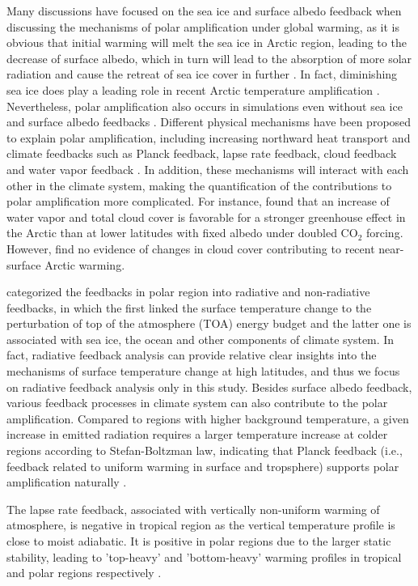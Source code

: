Many discussions have focused on the sea ice and surface albedo feedback when discussing the mechanisms of polar amplification under global warming, as it is obvious that initial warming will melt the sea ice in Arctic region, leading to the decrease of surface albedo, which in turn will lead to the absorption of more solar radiation and cause the retreat of sea ice cover in further \citep{Serreze2011}. In fact, diminishing sea ice does play a leading role in recent Arctic temperature amplification \citep{Screen2010}. Nevertheless, polar amplification also occurs in simulations even without sea ice and surface albedo feedbacks \citep[e.g.,][]{Alexeev2005,Langen2012,Cai2005,Cai2006}. Different physical mechanisms have been proposed to explain polar amplification, including increasing northward heat transport \citep{Alexeev2005} and climate feedbacks such as Planck feedback, lapse rate feedback, cloud feedback and water vapor feedback \citep{Pithan2014,Screen2010,Vavrus2004}. In addition, these mechanisms will interact with each other in the climate system, making the quantification of the contributions to polar amplification more complicated. For instance, \cite{Graversen2009} found that an increase of water vapor and total cloud cover is favorable for a stronger greenhouse effect in the Arctic than at lower latitudes with fixed albedo under doubled CO$_2$ forcing. However, \cite{Screen2010} find no evidence of changes in cloud cover contributing to recent near-surface Arctic warming.
 
\cite{Goosse2018} categorized the feedbacks in polar region into radiative and non-radiative feedbacks, in which the first linked the surface temperature change to the perturbation of top of the atmosphere (TOA) energy budget and the latter one is associated with sea ice, the ocean and other components of climate system. In fact, radiative feedback analysis can provide relative clear insights into the mechanisms of surface temperature change at high latitudes, and thus we focus on radiative feedback analysis only in this study. Besides surface albedo feedback, various feedback processes in climate system can also contribute to the polar amplification. Compared to regions with higher background temperature, a given increase in emitted radiation requires a larger temperature increase at colder regions according to Stefan-Boltzman law, indicating that Planck feedback (i.e., feedback related to uniform warming in surface and tropsphere) supports polar amplification naturally \citep{Pithan2014}.

The lapse rate feedback, associated with vertically non-uniform warming of atmosphere, is negative in tropical region as the vertical temperature profile is close to moist adiabatic. It is positive in polar regions due to the larger static stability, leading to 'top-heavy' and 'bottom-heavy' warming profiles in tropical and polar regions respectively \citep{Graversen2009, Pithan2014, Manabe1975, Kim2018}.

